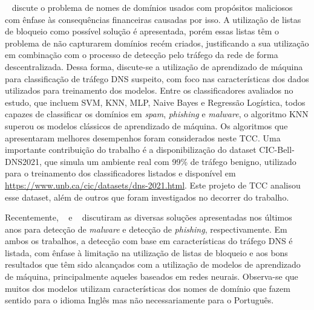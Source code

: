 ~\citet{cic-bell-dns-2021} discute o problema de nomes de domínios usados com propósitos maliciosos com ênfase às consequências financeiras causadas por isso. A utilização de listas de bloqueio como possível solução é apresentada, porém essas listas têm o problema de não capturarem domínios recém criados, justificando a sua utilização em combinação com o processo de detecção pelo tráfego da rede de forma descentralizada. Dessa forma, discute-se a utilização de aprendizado de máquina para classificação de tráfego DNS suspeito, com foco nas características dos dados utilizados para treinamento dos modelos. Entre os classificadores avaliados no estudo, que incluem SVM, KNN, MLP, Naive Bayes e Regressão Logística, todos capazes de classificar os domínios em \textit{spam}, \textit{phishing} e \textit{malware}, o algoritmo KNN superou os modelos clássicos de aprendizado de máquina. Os algoritmos que apresentaram melhores desempenhos foram considerados neste TCC. Uma importante contribuição do trabalho é a disponibilização do dataset CIC-Bell-DNS2021, que simula um ambiente real com 99\% de tráfego benigno, utilizado para o treinamento dos classificadores listados e disponível em \url{https://www.unb.ca/cic/datasets/dns-2021.html}. Este projeto de TCC analisou esse dataset, além de outros que foram investigados no decorrer do trabalho.

Recentemente, ~\citet{survey2} e ~\citet{survey3} discutiram as diversas soluções apresentadas nos últimos anos para detecção de \textit{malware} e detecção de \textit{phishing}, respectivamente. Em ambos os trabalhos, a detecção com base em características do tráfego DNS é listada, com ênfase à limitação na utilização de listas de bloqueio e aos bons resultados que têm sido alcançados com a utilização de modelos de aprendizado de máquina, principalmente aqueles baseados em redes neurais. Observa-se que muitos dos modelos utilizam características dos nomes de domínio que fazem sentido para o idioma Inglês mas não necessariamente para o Português.

